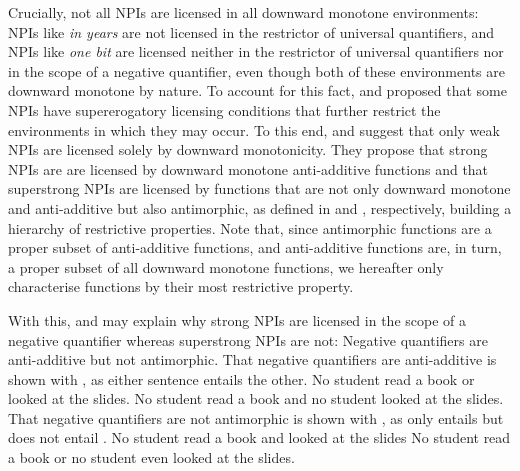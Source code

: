Crucially, not all NPIs are licensed in all downward monotone environments: NPIs like \textit{in years} are not licensed in the restrictor of universal quantifiers, and NPIs like \textit{one bit} are licensed neither in the restrictor of universal quantifiers nor in the scope of a negative quantifier, even though both of these environments are downward monotone by nature. To account for this fact, \textcite{Zwarts1998} and \textcite{Wouden1997} proposed that some NPIs have supererogatory licensing conditions that further restrict the environments in which they may occur. To this end, \textcite{Zwarts1998} and \textcite{Wouden1997} suggest that only weak NPIs are licensed solely by downward monotonicity. They propose that strong NPIs are are licensed by downward monotone anti-additive functions and that superstrong NPIs are licensed by functions that are not only downward monotone and anti-additive but also antimorphic, as defined in  and , respectively, building a hierarchy of restrictive properties.
\ex%
\xe
\ex%
\xe
Note that, since antimorphic functions are a proper subset of anti-additive functions, and anti-additive functions are, in turn, a proper subset of all downward monotone functions, we hereafter only characterise functions by their most restrictive property.

With this, \textcite{Zwarts1998} and \textcite{Wouden1997} may explain why strong NPIs are licensed in the scope of a negative quantifier whereas superstrong NPIs are not: Negative quantifiers are anti-additive but not antimorphic. That negative quantifiers are anti-additive is shown with , as either sentence entails the other.
\pex\label{ex:aa-no}%
\a No student read a book or looked at the slides.
\a No student read a book and no student looked at the slides.
\xe
That negative quantifiers are not antimorphic is shown with , as only  entails  but  does not entail .
\pex\label{ex:am-no}%
\a No student read a book and looked at the slides
\a No student read a book or no student even looked at the slides.
\xe

